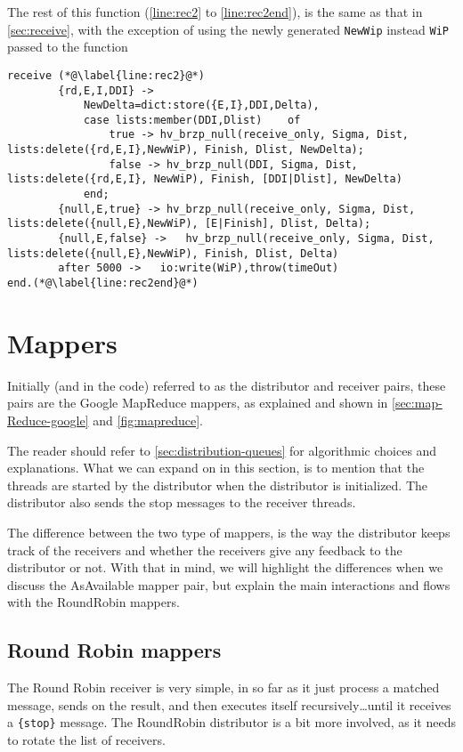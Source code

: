 The rest of this function (\autoref{line:rec2} to
\autoref{line:rec2end}), is the same as that in \autoref{sec:receive},
with the exception of using the newly generated \texttt{NewWip}
instead \texttt{WiP} passed to the function
\begin{lstlisting}[name=hvp2]
	receive (*@\label{line:rec2}@*)
		{rd,E,I,DDI} -> 
			NewDelta=dict:store({E,I},DDI,Delta),
			case lists:member(DDI,Dlist)	of
				true -> hv_brzp_null(receive_only, Sigma, Dist, lists:delete({rd,E,I},NewWiP), Finish, Dlist, NewDelta);
				false -> hv_brzp_null(DDI, Sigma, Dist, lists:delete({rd,E,I}, NewWiP), Finish, [DDI|Dlist], NewDelta)
			end;
		{null,E,true} -> hv_brzp_null(receive_only, Sigma, Dist, lists:delete({null,E},NewWiP), [E|Finish], Dlist, Delta);	
		{null,E,false} ->	hv_brzp_null(receive_only, Sigma, Dist, lists:delete({null,E},NewWiP), Finish, Dlist, Delta)
		after 5000 ->	io:write(WiP),throw(timeOut)
end.(*@\label{line:rec2end}@*)

\end{lstlisting}


\section{Mappers}

Initially (and in the code) referred to as the distributor
and receiver pairs, these pairs are the Google MapReduce mappers, as explained and shown
in \autoref{sec:map-Reduce-google} and \autoref{fig:mapreduce}.

The reader should refer to \autoref{sec:distribution-queues} for
algorithmic choices and explanations. What we can expand on in this
section, is to mention that the threads are started by the
distributor when the distributor is initialized. The distributor also
sends the stop messages to the receiver threads.

The difference between the two type of mappers, is the way the
distributor keeps track of the receivers and whether the receivers
give any feedback to the distributor or not. With that in mind, we
will highlight the differences when we discuss the AsAvailable mapper
pair, but explain the main interactions and flows with the RoundRobin mappers.

\subsection{Round Robin mappers}

The Round Robin receiver is very simple, in so far as it just process
a matched message, sends on the result, and then executes itself recursively\ldots until it
receives a \texttt{\{stop\}} message.
The RoundRobin distributor is a bit more involved, as it needs to
rotate the list of receivers.


